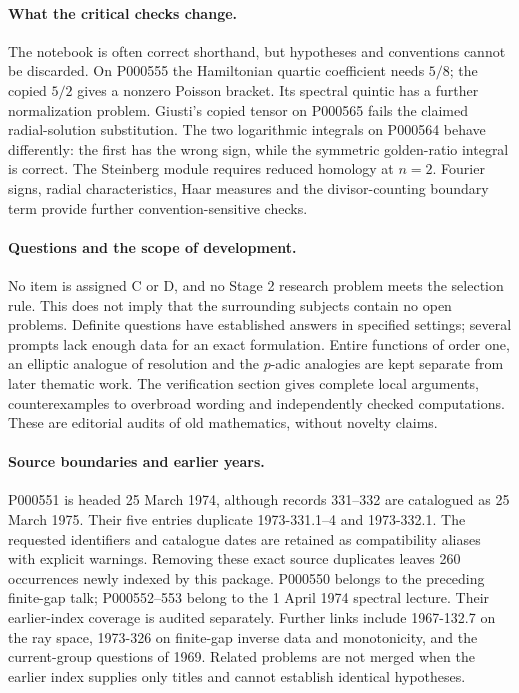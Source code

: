 \paragraph{What the critical checks change.}
The notebook is often correct shorthand, but hypotheses and conventions cannot
be discarded. On P000555 the Hamiltonian quartic coefficient needs \(5/8\);
the copied \(5/2\) gives a nonzero Poisson bracket. Its spectral quintic has
a further normalization problem. Giusti's copied tensor on P000565 fails
the claimed radial-solution substitution. The two logarithmic integrals on
P000564 behave differently: the first has the wrong sign, while the symmetric
golden-ratio integral is correct. The Steinberg module requires reduced
homology at \(n=2\). Fourier signs, radial characteristics, Haar measures and
the divisor-counting boundary term provide further convention-sensitive checks.

\paragraph{Questions and the scope of development.}
No item is assigned C or D, and no Stage 2 research problem meets the selection
rule. This does not imply that the surrounding subjects contain no open problems.
Definite questions have established answers in specified settings; several
prompts lack enough data for an exact formulation. Entire functions of order
one, an elliptic analogue of resolution and the \(p\)-adic analogies are kept
separate from later thematic work. The verification section gives complete
local arguments, counterexamples to overbroad wording and independently checked
computations. These are editorial audits of old mathematics, without novelty claims.

\paragraph{Source boundaries and earlier years.}
P000551 is headed 25 March 1974, although records 331--332 are catalogued as
25 March 1975. Their five entries duplicate 1973-331.1--4 and 1973-332.1.
The requested identifiers and catalogue dates are retained as compatibility
aliases with explicit warnings. Removing these exact source duplicates leaves
260 occurrences newly indexed by this package. P000550 belongs to the preceding
finite-gap talk; P000552--553 belong to the 1 April 1974 spectral lecture.
Their earlier-index coverage is audited separately. Further links include
1967-132.7 on the ray space, 1973-326 on finite-gap inverse data and monotonicity,
and the current-group questions of 1969. Related problems are not merged when
the earlier index supplies only titles and cannot establish identical hypotheses.

